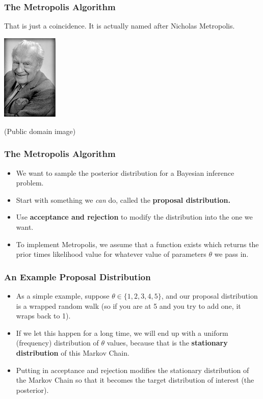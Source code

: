 \documentclass{beamer}
\begin{document}
\begin{frame}
\frametitle{The Metropolis Algorithm}
That is just a coincidence.
It is actually named after Nicholas Metropolis.

\begin{center}
\includegraphics[width=0.2\textwidth]{images/nicholas_metropolis.png}

(Public domain image)
\end{center}

\end{frame}


\begin{frame}
\frametitle{The Metropolis Algorithm}
\begin{itemize}
\item We want to sample the posterior distribution for a Bayesian inference problem. \pause
\item Start with something we {\em can} do, called the {\bf proposal distribution.}
\item Use {\bf acceptance and rejection} to modify the distribution into the
one we want.\pause
\item To implement Metropolis, we assume that a function exists which returns
the prior times likelihood value for whatever value of parameters $\theta$
we pass in.
\end{itemize}

\end{frame}

\begin{frame}
\frametitle{An Example Proposal Distribution}

\begin{itemize}
\item As a simple example, suppose $\theta \in \{1, 2, 3, 4, 5\}$, and our proposal
distribution is a wrapped random walk (so if you are at 5 and you try to add
one, it wraps back to 1).\pause
\item If we let this happen for a long time, we will end up with a uniform
(frequency) distribution of $\theta$ values, because that is the
{\bf stationary distribution} of this Markov Chain.\pause
\item Putting in acceptance and rejection modifies the stationary distribution
of the Markov Chain so that it becomes the target distribution of interest
(the posterior).
\end{itemize}

\end{frame}
\end{document}
